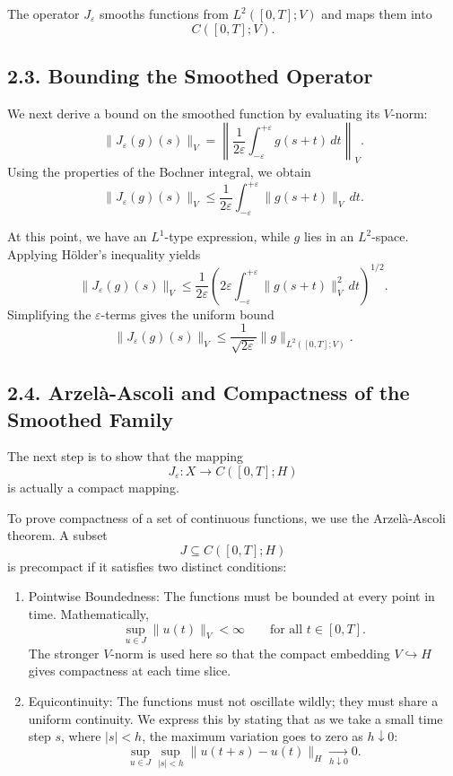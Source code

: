 \documentclass[11pt]{article}
\theoremstyle{definition}
\theoremstyle{remark}
\begin{document}
The operator \(J_\varepsilon\) smooths functions from \(L^2([0,T];V)\) and maps them into
\[
C([0,T];V).
\]

\subsection*{2.3. Bounding the Smoothed Operator}
We next derive a bound on the smoothed function by evaluating its \(V\)-norm:
\[
\|J_\varepsilon(g)(s)\|_V
=
\left\|
\frac{1}{2\varepsilon}\int_{-\varepsilon}^{+\varepsilon} g(s+t)\,dt
\right\|_V.
\]
Using the properties of the Bochner integral, we obtain
\[
\|J_\varepsilon(g)(s)\|_V
\le
\frac{1}{2\varepsilon}\int_{-\varepsilon}^{+\varepsilon}\|g(s+t)\|_V\,dt.
\]

At this point, we have an \(L^1\)-type expression, while \(g\) lies in an \(L^2\)-space. Applying Hölder's inequality yields
\[
\|J_\varepsilon(g)(s)\|_V
\le
\frac{1}{2\varepsilon}
\left(
2\varepsilon\int_{-\varepsilon}^{+\varepsilon}\|g(s+t)\|_V^2\,dt
\right)^{1/2}.
\]
Simplifying the \(\varepsilon\)-terms gives the uniform bound
\[
\|J_\varepsilon(g)(s)\|_V
\le
\frac{1}{\sqrt{2\varepsilon}}
\|g\|_{L^2([0,T];V)}.
\]

\subsection*{2.4. Arzelà-Ascoli and Compactness of the Smoothed Family}
The next step is to show that the mapping
\[
J_\varepsilon:X\to C([0,T];H)
\]
is actually a compact mapping.

To prove compactness of a set of continuous functions, we use the Arzelà-Ascoli theorem. A subset
\[
J\subseteq C([0,T];H)
\]
is precompact if it satisfies two distinct conditions:

\begin{enumerate}
\item Pointwise Boundedness: The functions must be bounded at every point in time. Mathematically,
\[
\sup_{u\in J}\|u(t)\|_V<\infty
\qquad
\text{for all } t\in[0,T].
\]
The stronger \(V\)-norm is used here so that the compact embedding \(V\hookrightarrow H\) gives compactness at each time slice.

\item Equicontinuity: The functions must not oscillate wildly; they must share a uniform continuity. We express this by stating that as we take a small time step \(s\), where \(|s|<h\), the maximum variation goes to zero as \(h\downarrow 0\):
\[
\sup_{u\in J}\sup_{|s|<h}\|u(t+s)-u(t)\|_H
\xrightarrow[h\downarrow 0]{}
0.
\]
\end{enumerate}
\end{document}
